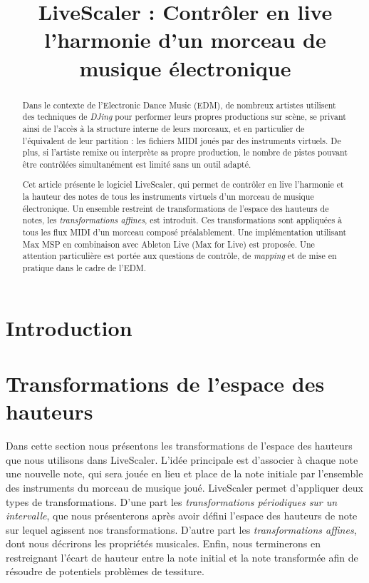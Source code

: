 \documentclass{article}
\title{LiveScaler : Contrôler en live l'harmonie d'un morceau de musique électronique}
\begin{document}
  

\maketitle

\sloppy

\begin{abstract}
Dans le contexte de l'Electronic Dance Music (EDM), de nombreux artistes utilisent des techniques de \emph{DJing} pour performer leurs propres productions sur scène, se privant ainsi de l'accès à la structure interne de leurs morceaux, et en particulier de l'équivalent de leur partition : les fichiers MIDI joués par des instruments virtuels. De plus, si l'artiste remixe ou interprète sa propre production, le nombre de pistes pouvant être contrôlées simultanément est limité sans un outil adapté.

Cet article présente le logiciel LiveScaler, qui permet de contrôler en live l'harmonie et la hauteur des notes de tous les instruments virtuels d'un morceau de musique électronique. Un ensemble restreint de transformations de l'espace des hauteurs de notes, les \emph{transformations affines}, est introduit. Ces transformations sont appliquées à tous les flux MIDI d'un morceau composé préalablement. Une implémentation utilisant Max MSP en combinaison avec Ableton Live (Max for Live) est proposée. Une attention particulière est portée aux questions de contrôle, de \emph{mapping} et de mise en pratique dans le cadre de l'EDM.
\end{abstract}

\section{Introduction}

\section{Transformations de l'espace des hauteurs}
Dans cette section nous présentons les transformations de l'espace des hauteurs que nous utilisons dans LiveScaler. L'idée principale est d'associer à chaque note une nouvelle note, qui sera jouée en lieu et place de la note initiale par l'ensemble des instruments du morceau de musique joué. LiveScaler permet d'appliquer deux types de transformations. D'une part les \emph{transformations périodiques sur un intervalle}, que nous présenterons après avoir défini l'espace des hauteurs de note sur lequel agissent nos transformations. D'autre part les \emph{transformations affines}, dont nous décrirons les propriétés musicales. Enfin, nous terminerons en restreignant l'écart de hauteur entre la note initial et la note transformée afin de résoudre de potentiels problèmes de tessiture.
\end{document}
